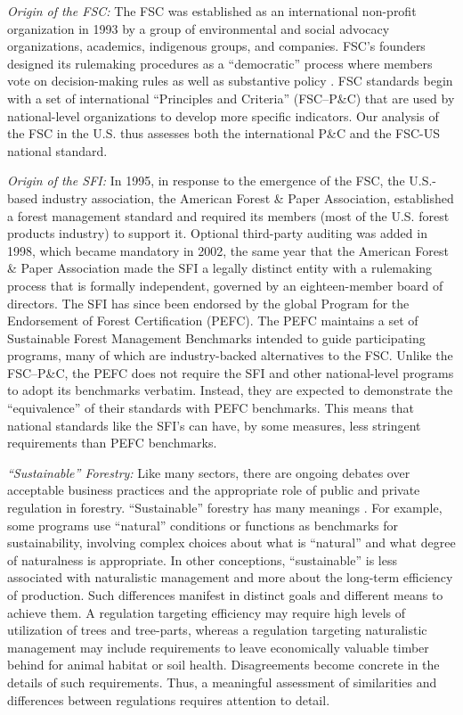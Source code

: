 \documentclass[
      12pt,
            Review ]{article}
\begin{document}
\emph{Origin of the FSC:} The FSC was established as an international
non-profit organization in 1993 by a group of environmental and social
advocacy organizations, academics, indigenous groups, and companies.
FSC's founders designed its rulemaking procedures as a ``democratic''
process where members vote on decision-making rules as well as
substantive policy \citep{Meidinger2003}. FSC standards begin with a set
of international ``Principles and Criteria'' (FSC--P\&C) that are used
by national-level organizations to develop more specific indicators. Our
analysis of the FSC in the U.S. thus assesses both the international
P\&C and the FSC-US national standard.

\emph{Origin of the SFI:} In 1995, in response to the emergence of the
FSC, the U.S.-based industry association, the American Forest \& Paper
Association, established a forest management standard and required its
members (most of the U.S. forest products industry) to support it.
Optional third-party auditing was added in 1998, which became mandatory
in 2002, the same year that the American Forest \& Paper Association
made the SFI a legally distinct entity with a rulemaking process that is
formally independent, governed by an eighteen-member board of directors.
The SFI has since been endorsed by the global Program for the
Endorsement of Forest Certification (PEFC). The PEFC maintains a set of
Sustainable Forest Management Benchmarks intended to guide participating
programs, many of which are industry-backed alternatives to the FSC.
Unlike the FSC--P\&C, the PEFC does not require the SFI and other
national-level programs to adopt its benchmarks verbatim. Instead, they
are expected to demonstrate the ``equivalence'' of their standards with
PEFC benchmarks. This means that national standards like the SFI's can
have, by some measures, less stringent requirements than PEFC
benchmarks.

\emph{``Sustainable'' Forestry:} Like many sectors, there are ongoing
debates over acceptable business practices and the appropriate role of
public and private regulation in forestry. ``Sustainable'' forestry has
many meanings \citep{McDermott2012}. For example, some programs use
``natural'' conditions or functions as benchmarks for sustainability,
involving complex choices about what is ``natural'' and what degree of
naturalness is appropriate. In other conceptions, ``sustainable'' is
less associated with naturalistic management and more about the
long-term efficiency of production. Such differences manifest in
distinct goals and different means to achieve them. A regulation
targeting efficiency may require high levels of utilization of trees and
tree-parts, whereas a regulation targeting naturalistic management may
include requirements to leave economically valuable timber behind for
animal habitat or soil health. Disagreements become concrete in the
details of such requirements. Thus, a meaningful assessment of
similarities and differences between regulations requires attention to
detail.
\end{document}
